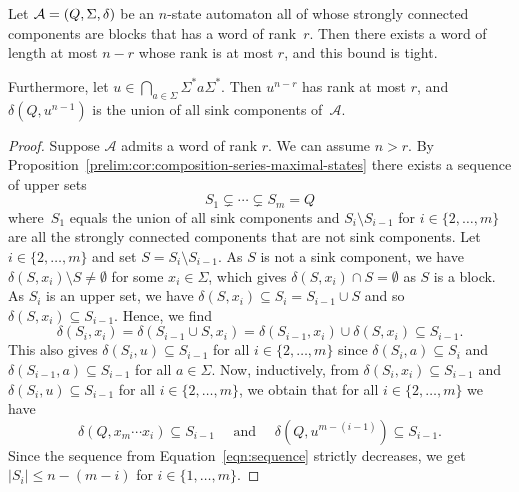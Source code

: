 \begin{theorem} \label{prelim:thm:SCCblocks-rank_r}
	Let $\mathcal A = (Q, \Sigma, \delta)$ be an $n$-state automaton all of whose strongly connected components are blocks that has a word of rank~$r$.
	Then there exists a word of length
	at most $n - r$ whose rank is at most $r$,
	and this bound is tight.
	
	Furthermore, let $u \in \bigcap_{a \in \Sigma}\Sigma^* a \Sigma^*$.
	Then $u^{n - r}$
	has rank at most $r$, and $\delta(Q, u^{n - 1})$
	is the union of all sink components of~$\mathcal A$.
\end{theorem}
\begin{proof}
	Suppose $\mathcal A$ admits a word of rank $r$.
	We can assume $n > r$.
	By Proposition~\ref{prelim:cor:composition-series-maximal-states}
	there exists a sequence of upper sets 
	\begin{equation}\label{eqn:sequence}
		S_1 \subsetneq \cdots \subsetneq S_m = Q
	\end{equation}
	where~$S_1$ equals the union of all sink components
	and $S_{i} \setminus S_{i-1}$ for $i \in \{2,\ldots,m\}$ 
	are all the strongly connected components that are not sink components.
	Let $i \in \{2,\ldots,m\}$
	and set $S = S_{i} \setminus S_{i-1}$.
	As $S$ is not a sink component,
	we have $\delta(S, x_i) \setminus S \ne \emptyset$
	for some $x_i \in \Sigma$,
	which gives $\delta(S, x_i) \cap S = \emptyset$
	as $S$ is a block.
	As $S_i$ is an upper set, 
	we have $\delta(S, x_i) \subseteq S_i = S_{i-1} \cup S$ 
	and so $\delta(S, x_i) \subseteq S_{i-1}$.
	Hence, we find
	\[
	\delta(S_i, x_i) = \delta(S_{i-1} \cup S, x_i) = \delta(S_{i-1}, x_i) \cup \delta(S, x_i) \subseteq S_{i-1}.
	\]
	This also gives $\delta(S_i, u) \subseteq S_{i-1}$ for all $i \in \{2,\ldots,m\}$
	since $\delta(S_i, a) \subseteq S_i$ and $\delta(S_{i-1}, a) \subseteq S_{i-1}$
	for all $a \in \Sigma$.
	Now, inductively,  
	from $\delta(S_i, x_i) \subseteq S_{i-1}$
	and  $\delta(S_i, u) \subseteq S_{i-1}$ for all $i \in \{2,\ldots,m\}$,
	we obtain that
	for all $i \in \{2,\ldots,m\}$ we have
	\begin{equation*}\label{eqn:word-each-letter}
		\delta(Q, x_m \cdots x_i) \subseteq S_{i-1}
		\quad\text{ and }\quad
		\delta(Q, u^{m - (i - 1)}) \subseteq S_{i-1}.
	\end{equation*}
	Since the sequence from Equation~\eqref{eqn:sequence}
	strictly decreases, we get $|S_i| \le n - (m - i)$
	for $i \in \{1,\ldots,m\}$.

\end{proof}
